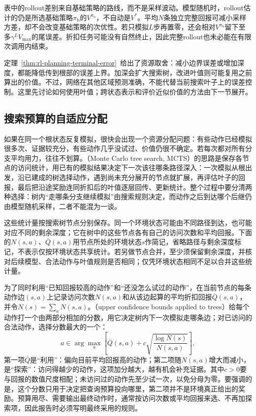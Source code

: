 表中的rollout差别来自基础策略的路线，而不是采样波动。模型随机时，rollout估计的仍是所选基础策略$\pi_{\mathrm b}$的$V^{\pi_{\mathrm b}}$，不自动是$V^*$。平均$N$条独立完整回报可减小采样方差，却不会改变基础策略的次优性。若只模拟$L$步再置零，还会相对$V^{\pi_{\mathrm b}}$留下至多$\gamma^L V_{\max}$的尾误差。折扣任务可能没有自然终止，因此完整rollout也未必能在有限次调用内结束。

定理~\ref{thm:rl-planning-terminal-error}~给出了资源取舍：减小边界误差或增加深度，都能降低传到根部的误差上界。加深会扩大搜索树，改进叶值则可能复用之前算出的价值。不过，网络在其他区域预测准确，不能代替当前搜索叶子上的误差控制。这里先讨论如何使用叶值；跨状态表示和评价近似价值的方法由下一节展开。

\subsection{搜索预算的自适应分配}
\label{sec:rl-planning-mcts}

如果在同一个根状态反复模拟，很快会出现一个资源分配问题：有些动作已经模拟很多次、证据较充分，有些动作几乎没试过、价值仍很不确定。若每次都对所有分支平均用力，往往不划算。（Monte Carlo tree search, MCTS）的思路是保存各节点的访问统计，用已有的模拟结果决定下一次该往哪条路径深入：一次模拟从根出发，沿已建成的树选择动作，遇到尚未充分展开的节点就扩展，再评估叶子的回报，最后把沿途奖励连同折扣后的叶值逐层回传、更新统计。整个过程中要分清两种选择：树内“走哪条分支继续模拟”由搜索规则决定，而动作之后到达哪个后继仍由模型随机采样，二者不能混为一谈。

这些统计量按搜索树节点分别保存。同一个环境状态可能由不同路径到达，也可能对应不同的剩余深度；它在树中的这些节点各有自己的访问次数和平均回报。下面的$N(s,a)$、$\bar Q(s,a)$用节点所处的环境状态$s$作简记，省略路径与剩余深度标记，不表示仅按环境状态共享统计。若另做节点合并，至少须保留剩余深度，并核对后续模型、合法动作与叶值规则是否相同；仅凭环境状态相同不足以合并这些统计量。

为了同时利用“已知回报较高的动作”和“还没怎么试过的动作”，在当前节点的每条动作边$(s,a)$上记录访问次数$N(s,a)$和从该边起算的平均折扣回报$\bar Q(s,a)$，并令$N(s)=\sum_aN(s,a)$。（upper confidence bounds applied to trees）给每个动作打一个由两部分相加的分数，用它决定树内下一次模拟走哪条边；对已访问的合法动作，选择分数最大的一个：
\begin{equation}
 a\in\arg\max_a\left[
 \bar Q(s,a)+c\sqrt{\frac{\log N(s)}{N(s,a)}}\right],
 \label{eq:rl-planning-uct}
\end{equation}
第一项$\bar Q$是“利用”：偏向目前平均回报高的动作；第二项随$N(s,a)$增大而减小，是“探索”：访问得越少的动作，这项加分越大，越有机会补充证据。其中$c>0$要与回报的数值尺度相配；未访问过的动作先至少试一次，以免分母为零。要强调的是，这个分数只用于决定把查询预算投向哪里，第二项并不是环境真正给出的奖励。预算用尽、需要输出最终动作时，通常按访问次数或平均回报来选、不再加探索项，因此报告时必须写明最终采用的规则。

